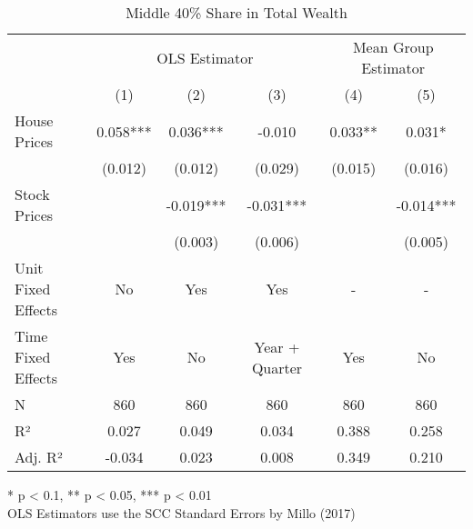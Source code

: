 \begin{table}[t]
\caption{Middle 40\% Share in Total Wealth} 
\fontsize{12.0pt}{14.4pt}\selectfont
\begin{tabular*}{\linewidth}{@{\extracolsep{\fill}}lccccc}
\toprule
 & \multicolumn{3}{c}{OLS Estimator} & \multicolumn{2}{c}{Mean Group Estimator} \\ 
\cmidrule(lr){2-4} \cmidrule(lr){5-6}
  & (1) & (2) & (3) & (4) & (5) \\ 
\midrule\addlinespace[2.5pt]
House Prices & 0.058*** & 0.036*** & -0.010 & 0.033** & 0.031* \\ 
 & (0.012) & (0.012) & (0.029) & (0.015) & (0.016) \\ 
Stock Prices &  & -0.019*** & -0.031*** &  & -0.014*** \\ 
{} & {} & {(0.003)} & {(0.006)} & {} & {(0.005)} \\ 
Unit Fixed Effects & No & Yes & Yes & - & - \\ 
{Time Fixed Effects} & {Yes} & {No} & {Year + Quarter} & {Yes} & {No} \\ 
N & 860 & 860 & 860 & 860 & 860 \\ 
R² & 0.027 & 0.049 & 0.034 & 0.388 & 0.258 \\ 
Adj. R² & -0.034 & 0.023 & 0.008 & 0.349 & 0.210 \\ 
\bottomrule
\end{tabular*}
\begin{minipage}{\linewidth}
* p < 0.1, ** p < 0.05, *** p < 0.01\\
OLS Estimators use the SCC Standard Errors by Millo (2017)\\
\end{minipage}
\end{table}

